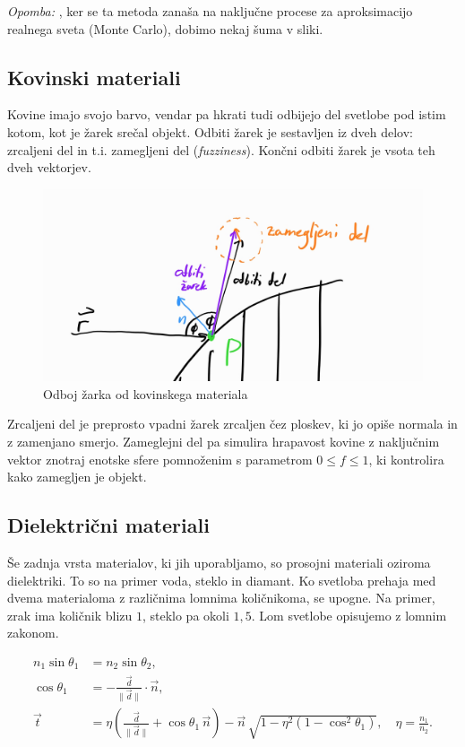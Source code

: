 \documentclass[12pt, a4paper]{article}
\begin{document}
\textit{Opomba: }, ker se ta metoda zanaša na naključne procese za aproksimacijo realnega sveta (Monte Carlo),
dobimo nekaj šuma v sliki.

\subsection{Kovinski materiali}

Kovine imajo svojo barvo, vendar pa hkrati tudi odbijejo del svetlobe pod istim kotom, kot je
žarek srečal objekt. Odbiti žarek je sestavljen iz dveh delov: zrcaljeni del in t.i. zamegljeni del
(\textit{fuzziness}). Končni odbiti žarek je vsota teh dveh vektorjev.

\begin{figure}[H]
	\centering
	\includegraphics[width=400pt]{metal}
	\caption{Odboj žarka od kovinskega materiala}
\end{figure}

Zrcaljeni del je preprosto vpadni žarek zrcaljen čez ploskev, ki jo opiše normala in z zamenjano smerjo.
Zameglejni del pa simulira hrapavost kovine z naključnim vektor znotraj enotske sfere pomnoženim
s parametrom $0 \leq f \leq 1$, ki kontrolira kako zamegljen je objekt.

\subsection{Dielektrični materiali}
Še zadnja vrsta materialov, ki jih uporabljamo, so prosojni materiali oziroma dielektriki. To so na primer voda,
steklo in diamant. Ko svetloba prehaja med dvema materialoma z različnima lomnima količnikoma, se upogne.
Na primer, zrak ima količnik blizu $1$, steklo pa okoli $1,5$. Lom svetlobe opisujemo z lomnim zakonom.

$$
	\begin{aligned}
		n_1 \sin\theta_1 & = n_2 \sin\theta_2,                                                               \\
		\cos\theta_1     & = -\frac{\vec{d}}{\lVert \vec{d} \rVert} \cdot \vec{n},                           \\
		\vec{t}          & = \eta \left(\frac{\vec{d}}{\lVert \vec{d} \rVert} + \cos\theta_1\,\vec{n}\right)
		- \vec{n}\,\sqrt{1 - \eta^2\!\left(1 - \cos^2\theta_1\right)}, \quad \eta = \frac{n_1}{n_2}.
	\end{aligned}
$$
\end{document}
